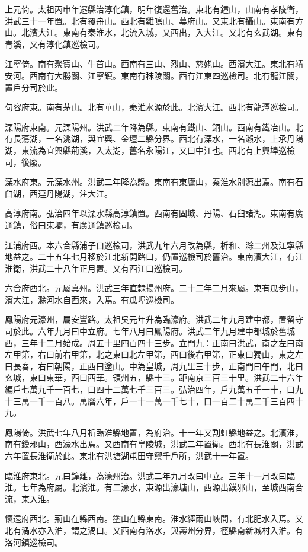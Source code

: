 上元倚。太祖丙申年遷縣治淳化鎮，明年復還舊治。東北有鐘山，山南有孝陵衛，洪武三十一年置。北有覆舟山。西北有雞鳴山、幕府山。又東北有攝山。東南有方山。北濱大江。東南有秦淮水，北流入城，又西出，入大江。又北有玄武湖。東有青溪，又有淳化鎮巡檢司。

江寧倚。南有聚寶山、牛首山。西南有三山、烈山、慈姥山。西濱大江。東北有靖安河。西南有大勝關、江寧鎮。東南有秣陵關。西有江東四巡檢司。北有龍江關，置戶分司於此。

句容府東。南有茅山。北有華山，秦淮水源於此。北濱大江。西北有龍潭巡檢司。

溧陽府東南。元溧陽州。洪武二年降為縣。東南有鐵山、銅山。西南有鐵冶山。北有長蕩湖，一名洮湖，與宜興、金壇二縣分界。西北有溧水，一名瀨水，上承丹陽湖，東流為宜興縣荊溪，入太湖，舊名永陽江，又曰中江也。西北有上興埠巡檢司，後廢。

溧水府東。元溧水州。洪武二年降為縣。東南有東廬山，秦淮水別源出焉。南有石臼湖，西連丹陽湖，注大江。

高淳府南。弘治四年以溧水縣高淳鎮置。西南有固城、丹陽、石臼諸湖。東南有廣通鎮，俗曰東壩，有廣通鎮巡檢司。

江浦府西。本六合縣浦子口巡檢司，洪武九年六月改為縣，析和、滁二州及江寧縣地益之。二十五年七月移於江北新開路口，仍置巡檢司於舊治。東南濱大江，有江淮衛，洪武二十八年正月置。又有西江口巡檢司。

六合府西北。元屬真州。洪武三年直隸揚州府。二十二年二月來屬。東有瓜步山，濱大江，滁河水自西來，入焉。有瓜埠巡檢司。

鳳陽府元濠州，屬安豐路。太祖吳元年升為臨濠府。洪武二年九月建中都，置留守司於此。六年九月曰中立府。七年八月曰鳳陽府。洪武二年九月建中都城於舊城西，三年十二月始成。周五十里四百四十三步。立門九：正南曰洪武，南之左曰南左甲第，右曰前右甲第，北之東曰北左甲第，西曰後右甲第，正東曰獨山，東之左曰長春，右曰朝陽，正西曰塗山。中為皇城，周九里三十步，正南門曰午門，北曰玄城，東曰東華，西曰西華。領州五，縣十三。距南京三百三十里。洪武二十六年編戶七萬九千一百七，口四十二萬七千三百三。弘治四年，戶九萬五千一十，口九十三萬一千一百八。萬曆六年，戶一十一萬一千七十，口一百二十萬二千三百四十九。

鳳陽倚。洪武七年八月析臨淮縣地置，為府治。十一年又割虹縣地益之。北濱淮，南有鏌邪山，西濠水出焉。又西南有皇陵城，洪武二年置衛。西北有長淮關，洪武六年置長淮衛於此。東北有洪塘湖屯田守禦千戶所，洪武十一年置。

臨淮府東北。元曰鐘離，為濠州治。洪武二年九月改曰中立。三年十一月改曰臨淮。七年為府屬。北濱淮。有二濠水，東源出濠塘山，西源出鏌邪山，至城西南合流，東入淮。

懷遠府西北。荊山在縣西南。塗山在縣東南。淮水經兩山峽間，有北肥水入焉。又北有渦水亦入淮，謂之渦口。又西南有洛水，與壽州分界，徑縣南新城村入淮。有洛河鎮巡檢司。

